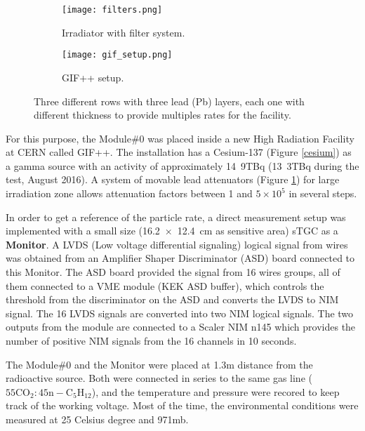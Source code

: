 \begin{figure}[t]
		\hspace*{\fill}
		\begin{subfigure}[b]{0.25\textwidth}
			\centering
			\texttt{[image: filters.png]}
			\caption{Irradiator with filter system. }\label{filters}
		\end{subfigure}
		\hfill
		\begin{subfigure}[b]{0.45\textwidth}
			\centering
			\texttt{[image: gif\_setup.png]}
			\caption{GIF++ setup.}\label{gifsetup}
		\end{subfigure}
		\hspace*{\fill}
		\caption{Three different rows with
		three lead (Pb) layers, each one with different thickness to provide multiples rates for the facility.}\label{}
\end{figure}

For this purpose, the Module\#0 was
placed inside a new High Radiation Facility at CERN called GIF++\cite{gif}.
The installation has a Cesium-137 (Figure \ref{cesium}) as a gamma source with an activity of approximately
\unit{14.9}{TBq} (\unit{13.3}{TBq} during the test, August 2016). 
A system of movable lead attenuators (Figure \ref{filters}) for large irradiation zone allows attenuation factors
between 1 and $5\times10^5$
in several steps.\par 

In order to get a reference of the particle rate, a direct measurement setup was implemented with a  small size
(\SI{16,2x12,4}{cm} as sensitive area) sTGC as a {\bf Monitor}. A LVDS (Low voltage differential signaling) logical
signal from wires was obtained from an Amplifier Shaper Discriminator (ASD) board\cite{asdchip} connected to this
Monitor. The ASD board provided the signal from 16 wires groups, all of them connected to a VME module (KEK ASD
buffer), which controls the threshold from the discriminator on the ASD and converts the LVDS to NIM signal. The 16
LVDS signals are converted into two NIM logical signals. The two outputs from the module are connected to a Scaler NIM
n145 which provides the number of positive NIM signals from the 16 channels in 10 seconds.\par

The Module\#0 and the Monitor were placed at 1.3m distance from the radioactive source. Both were connected in series
to the same gas line ($\mathrm{55 CO_2 : 45 n-C_5H_{12}}$), and the temperature and pressure were recored to keep track of the working voltage. Most of the
time, the environmental conditions were measured at 25 Celsius degree and \unit{971}{mb}.\par 


